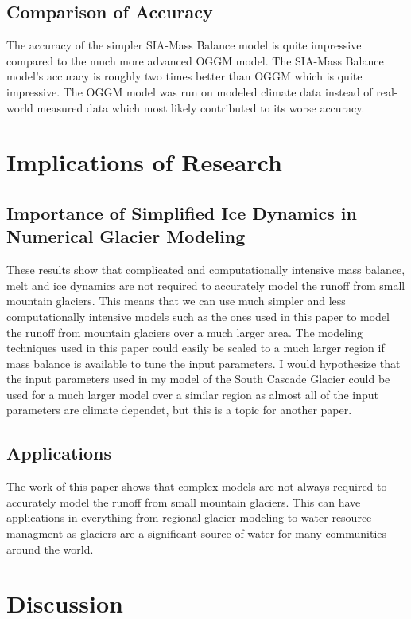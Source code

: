\documentclass{article}
\begin{document}
\subsection{Comparison of Accuracy}
The accuracy of the simpler SIA-Mass Balance model is quite impressive compared to the much more advanced OGGM model. The SIA-Mass Balance 
model's accuracy is roughly two times better than OGGM which is quite impressive. The OGGM model was run on modeled climate data instead of 
real-world measured data which most likely contributed to its worse accuracy. 
\section{Implications of Research}
\subsection{Importance of Simplified Ice Dynamics in Numerical Glacier Modeling}
These results show that complicated and computationally intensive mass balance, melt and ice dynamics are not required to accurately model the 
runoff from small mountain glaciers. This means that we can use much simpler and less computationally intensive models such as the ones used 
in this paper to model the runoff from mountain glaciers over a much larger area. The modeling techniques used in this paper could easily be 
scaled to a much larger region if mass balance is available to tune the input parameters. I would hypothesize that the input parameters used 
in my model of the South Cascade Glacier could be used for a much larger model over a similar region as almost all of the input parameters are 
climate dependet, but this is a topic for another paper. 
\subsection{Applications}
The work of this paper shows that complex models are not always required to accurately model the runoff from small mountain glaciers. This 
can have applications in everything from regional glacier modeling to water resource managment as glaciers are a significant source of water 
for many communities around the world. 

\section{Discussion}
\end{document}
